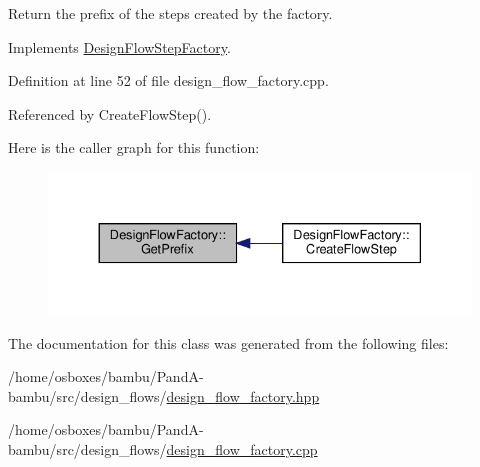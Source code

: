 Return the prefix of the steps created by the factory. 



Implements \hyperlink{classDesignFlowStepFactory_a52abfc00c170b5a63e84431b75eb698e}{Design\+Flow\+Step\+Factory}.



Definition at line 52 of file design\+\_\+flow\+\_\+factory.\+cpp.



Referenced by Create\+Flow\+Step().

Here is the caller graph for this function\+:
\nopagebreak
\begin{figure}[H]
\begin{center}
\leavevmode
\includegraphics[width=330pt]{d7/d9e/classDesignFlowFactory_a926debf95513064610a97e5240f5c530_icgraph}
\end{center}
\end{figure}


The documentation for this class was generated from the following files\+:\begin{DoxyCompactItemize}
\item 
/home/osboxes/bambu/\+Pand\+A-\/bambu/src/design\+\_\+flows/\hyperlink{design__flow__factory_8hpp}{design\+\_\+flow\+\_\+factory.\+hpp}\item 
/home/osboxes/bambu/\+Pand\+A-\/bambu/src/design\+\_\+flows/\hyperlink{design__flow__factory_8cpp}{design\+\_\+flow\+\_\+factory.\+cpp}\end{DoxyCompactItemize}
